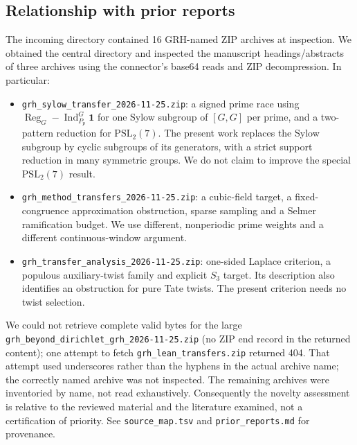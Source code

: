 \documentclass[11pt]{article}
\theoremstyle{remark}\newtheorem{remark}[theorem]{Remark}
\DeclareMathOperator{\Ind}{Ind}
\DeclareMathOperator{\Reg}{Reg}
\newcommand{\one}{\mathbf 1}
\begin{document}
\subsection{Relationship with prior reports}
The incoming directory \cite{incoming} contained 16 GRH-named ZIP
archives at inspection. We obtained the central directory and inspected
the manuscript headings/abstracts of three archives using the connector's
base64 reads and ZIP decompression. In particular:
\begin{itemize}
\item \texttt{grh\_sylow\_transfer\_2026-11-25.zip}: a signed prime race
using $\Reg_G-\Ind_{P_p}^G\one$ for one Sylow subgroup of $[G,G]$ per
prime, and a two-pattern reduction for $\mathrm{PSL}_2(7)$. The present
work replaces the Sylow subgroup by cyclic subgroups of its generators,
with a strict support reduction in many symmetric groups. We do not
claim to improve the special $\mathrm{PSL}_2(7)$ result.
\item \texttt{grh\_method\_transfers\_2026-11-25.zip}: a cubic-field
target, a fixed-congruence approximation obstruction, sparse sampling
and a Selmer ramification budget. We use different, nonperiodic prime
weights and a different continuous-window argument.
\item \texttt{grh\_transfer\_analysis\_2026-11-25.zip}: one-sided
Laplace criterion, a populous auxiliary-twist family and explicit
$S_3$ target. Its description also identifies an obstruction for pure
Tate twists. The present criterion needs no twist selection.
\end{itemize}
We could not retrieve complete valid bytes for the large
\nolinkurl{grh_beyond_dirichlet_grh_2026-11-25.zip} (no ZIP end record
in the returned content); one attempt to fetch
\texttt{grh\_lean\_transfers.zip} returned 404. That attempt used underscores rather than the hyphens in the actual
archive name; the correctly named archive was not inspected. The remaining
archives were inventoried by name, not read exhaustively. Consequently the
novelty assessment is relative to the reviewed material and the
literature examined, not a certification of priority. See
\texttt{source\_map.tsv} and \texttt{prior\_reports.md} for provenance.
\end{document}

